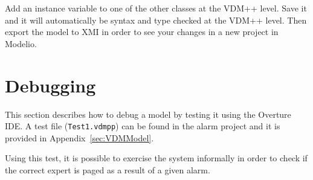 \begin{myexercise}\label{ex:rosemapping}
Add an instance variable to one of the other classes at the VDM++ level. Save it and it will automatically be syntax and type checked at the VDM++ level. Then export the model to XMI in order to see your changes in a new project in Modelio.
\end{myexercise}
%
\section{Debugging}\label{sec:debugging}
This section describes how to debug a model by testing it using the Overture IDE. A test file (\texttt{Test1.vdmpp}) can be found in the alarm project and it is provided in Appendix~\ref{sec:VDMModel}.

\lstset{language=VDM++}
%

Using this test, it is possible to exercise the system informally in order to check if the correct expert is paged as a result of a given alarm.
%
